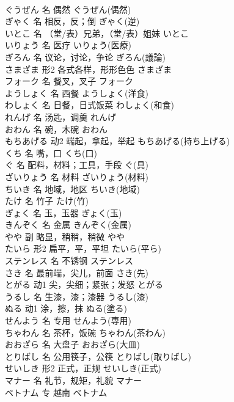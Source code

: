 \documentclass[8pt]{extreport}
\begin{document}
\begin{CJK}{UTF8}{min}
\\	ぐうぜん	名	偶然	ぐうぜん(偶然)	
\\	ぎゃく	名	相反，反；倒	ぎゃく(逆)	
\\	いとこ	名	（堂/表）兄弟，（堂/表）姐妹	いとこ	
\\	いりょう	名	医疗	いりょう(医療)	
\\	ぎろん	名	议论，讨论，争论	ぎろん(議論)	
\\	さまざま	形2	各式各样，形形色色	さまざま	
\\	フォーク	名	餐叉，叉子	フォーク	
\\	ようしょく	名	西餐	ようしょく(洋食)	
\\	わしょく	名	日餐，日式饭菜	わしょく(和食)	
\\	れんげ	名	汤匙，调羹	れんげ	
\\	おわん	名	碗，木碗	おわん	
\\	もちあげる	动2	端起，拿起，举起	もちあげる(持ち上げる)	
\\	くち	名	嘴，口	くち(口)	
\\	ぐ	名	配料，材料；工具，手段	ぐ(具)	
\\	ざいりょう	名	材料	ざいりょう(材料)	
\\	ちいき	名	地域，地区	ちいき(地域)	
\\	たけ	名	竹子	たけ(竹)	
\\	ぎょく	名	玉，玉器	ぎょく(玉)	
\\	きんぞく	名	金属	きんぞく(金属)	
\\	やや	副	略显，稍稍，稍微	やや	
\\	たいら	形2	扁平，平，平坦	たいら(平ら)	
\\	ステンレス	名	不锈钢	ステンレス	
\\	さき	名	最前端，尖儿，前面	さき(先)	
\\	とがる	动1	尖，尖细；紧张；发怒	とがる	
\\	うるし	名	生漆，漆；漆器	うるし(漆)	
\\	ぬる	动1	涂，擦，抹	ぬる(塗る)	
\\	せんよう	名	专用	せんよう(専用)	
\\	ちゃわん	名	茶杯，饭碗	ちゃわん(茶わん)	
\\	おおざら	名	大盘子	おおざら(大皿)	
\\	とりばし	名	公用筷子，公筷	とりばし(取りばし)	
\\	せいしき	形2	正式，正规	せいしき(正式)	
\\	マナー	名	礼节，规矩，礼貌	マナー	
\\	ベトナム	专	越南	ベトナム	

\end{CJK}
\end{document}
